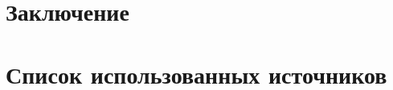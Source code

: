 \hl{}

\hl{}

\hl{}

\hl{}

\section*{\texorpdfstring{Заключение
}{Заключение }}\label{ux437ux430ux43aux43bux44eux447ux435ux43dux438ux435}

\hl{}

\hl{}

\hl{\hfill\break
}

\section*{Список использованных
источников}\label{ux441ux43fux438ux441ux43eux43a-ux438ux441ux43fux43eux43bux44cux437ux43eux432ux430ux43dux43dux44bux445-ux438ux441ux442ux43eux447ux43dux438ux43aux43eux432}

\hl{}


